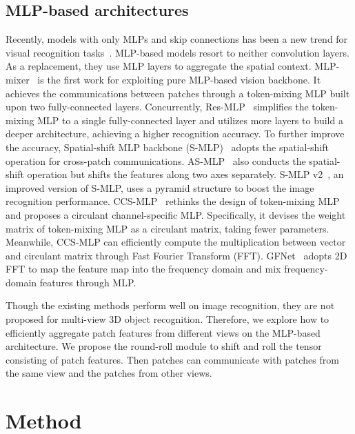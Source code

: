 \documentclass[11pt]{article}
\begin{document}
\subsection{MLP-based architectures}
Recently, models with only MLPs and skip connections has been a new trend for visual recognition tasks~\citep{tolstikhin2021mlp,touvron2022resmlp,yu2022s2mlp,yu2021rethinking,yu2021s2mlpv2}. MLP-based models resort to neither convolution layers. As a replacement, they use MLP layers to aggregate the spatial context. MLP-mixer~\citep{tolstikhin2021mlp} is the first work for exploiting pure MLP-based vision backbone. It achieves the communications between patches through a token-mixing MLP built upon two fully-connected layers. Concurrently, Res-MLP~\citep{touvron2022resmlp} simplifies the token-mixing MLP to a single fully-connected layer and utilizes more layers to build a deeper architecture, achieving a higher recognition accuracy. To further improve the accuracy, Spatial-shift MLP backbone (S-MLP)~\citep{yu2022s2mlp} adopts the spatial-shift operation for cross-patch communications. AS-MLP~\citep{lian2022as} also conducts the spatial-shift operation but shifts the features along two axes separately. S-MLP v2~\citep{yu2021s2mlpv2}, an improved version of S-MLP, uses a pyramid structure to boost the image recognition performance. CCS-MLP~\citep{yu2021rethinking} rethinks the design of token-mixing MLP and proposes a circulant channel-specific MLP. Specifically, it devises the weight matrix of token-mixing MLP as a circulant matrix, taking fewer parameters. Meanwhile, CCS-MLP can efficiently compute the multiplication between vector and circulant matrix through Fast Fourier Transform (FFT). GFNet~\citep{rao2021global} adopts 2D FFT to map the feature map into the frequency domain and mix frequency-domain features through MLP.

Though the existing methods perform well on image recognition, they are not proposed for multi-view 3D object recognition. Therefore, we explore how to efficiently aggregate patch features from different views on the MLP-based architecture. We propose the round-roll module to shift and roll the tensor consisting of patch features. Then patches can communicate with patches from the same view and the patches from other views.

\section{Method}
\end{document}

